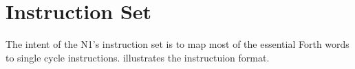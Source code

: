 
\section{Instruction Set}
\label{opcodes}

The intent of the N1's instruction set is to map most of the essential Forth words
to single cycle instructions.  illustrates the instructuion
format.

